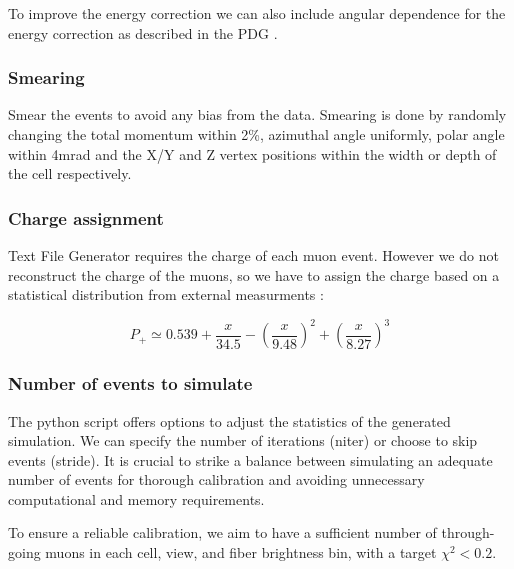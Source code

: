 \documentclass[12pt]{article}
\begin{document}
To improve the energy correction we can also include angular dependence for the energy correction as described in the PDG \cite{rpp2022-rev-cosmic-rays.pdf}.

\subsubsection{Smearing}
Smear the events to avoid any bias from the data. Smearing is done by randomly changing the total momentum within 2\%, azimuthal angle uniformly, polar angle within 4mrad and the X/Y and Z vertex positions within the width or depth of the cell respectively.

\subsubsection{Charge assignment}
Text File Generator requires the charge of each muon event. However we do not reconstruct the charge of the muons, so we have to assign the charge based on a statistical distribution from external measurments \cite{NOVA-doc-51327-v3}:


\begin{equation}
P_+ \simeq 0.539 + \frac{x}{34.5}-\left(\frac{x}{9.48}\right)^2 + \left(\frac{x}{8.27}\right)^3
\end{equation}

\subsubsection{Number of events to simulate}\label{secNumEvents}
The python script offers options to adjust the statistics of the generated simulation. We can specify the number of iterations (niter) or choose to skip events (stride). It is crucial to strike a balance between simulating an adequate number of events for thorough calibration and avoiding unnecessary computational and memory requirements.

To ensure a reliable calibration, we aim to have a sufficient number of through-going muons in each cell, view, and fiber brightness bin, with a target $\chi^2<0.2$.
\end{document}
